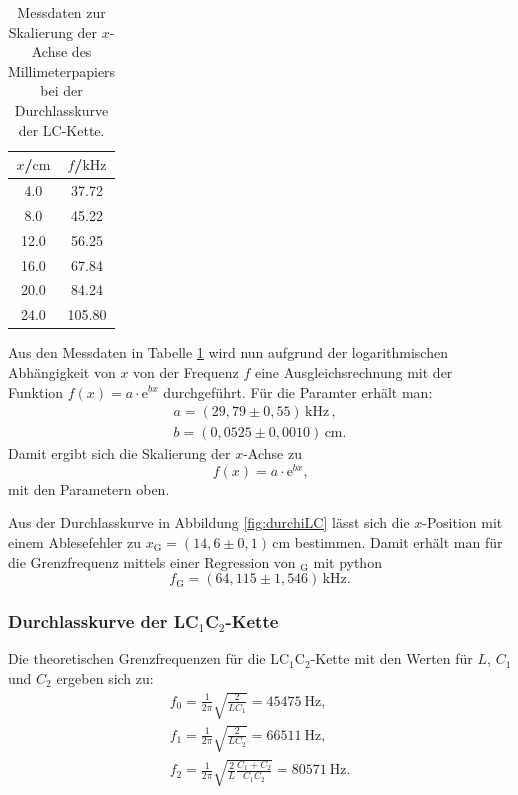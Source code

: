 \begin{table}
	\caption{Messdaten zur Skalierung der $x$-Achse des Millimeterpapiers bei der
	Durchlasskurve der LC-Kette.}
	\label{tab:skalaLC}
	\centering
	\begin{tabular}{cc}
		\toprule
		$x$/$\si{\centi\meter}$ & $f$/$\si{\kilo\hertz}$ \\
		\midrule
		4.0                     & 37.72                  \\
		8.0                     & 45.22                  \\
		12.0                    & 56.25                  \\
		16.0                    & 67.84                  \\
		20.0                    & 84.24                  \\
		24.0                    & 105.80                 \\
		\bottomrule
	\end{tabular}
\end{table}
Aus den Messdaten in Tabelle \ref{tab:skalaLC} wird nun aufgrund der logarithmischen
Abhängigkeit von $x$ von der Frequenz $f$ eine Ausgleichsrechnung mit der Funktion
$f(x) = a \cdot \mathrm{e}^{bx}$ durchgeführt.
Für die Paramter erhält man:
\begin{gather*}
	a = (29,79 \pm 0,55) \, \si{\kilo\hertz} \, \text{,}  \\
	b = (0,0525 \pm 0,0010) \, \si{\centi\meter} \text{.}
\end{gather*}
Damit ergibt sich die Skalierung der $x$-Achse zu
\begin{equation}
	f(x) = a \cdot \mathrm{e}^{bx} \text{,}
\end{equation}
mit den Parametern oben.

Aus der Durchlasskurve in Abbildung \ref{fig:durchiLC} lässt sich die $x$-Position mit einem
Ablesefehler zu $x_{\text{G}} = (14,6 \pm 0,1) \, \si{\centi\meter}$ bestimmen.
Damit erhält man für die Grenzfrequenz mittels einer Regression von $_{\text{G}}$ mit python
\begin{equation*}
	f_{\text{G}} = (64,115 \pm 1,546 ) \, \si{\kilo\hertz} \text{.}
\end{equation*}


\FloatBarrier
\subsubsection{Durchlasskurve der LC$_1$C$_2$-Kette}

Die theoretischen Grenzfrequenzen für die LC$_1$C$_2$-Kette mit den Werten für
$L$, $C_1$ und $C_2$ ergeben sich zu:
\begin{gather*}
	f_0 = \frac{1}{2\pi} \sqrt{\frac{2}{LC_1}} = \SI{45475}{\hertz} \text{,} \\
	f_1 = \frac{1}{2\pi} \sqrt{\frac{2}{LC_2}} = \SI{66511}{\hertz} \text{,} \\
	f_2 = \frac{1}{2\pi} \sqrt{\frac{2}{L} \frac{C_1+C_2}{C_1C_2}} = \SI{80571}{\hertz} \text{.}
\end{gather*}


